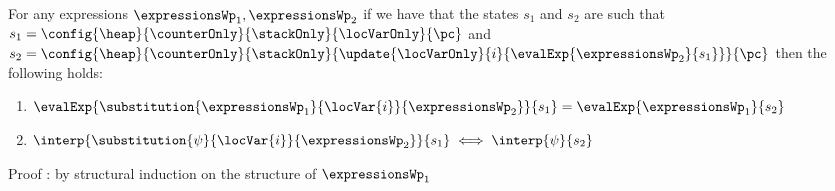\begin{substLv}\label{substLv}
For any expressions $ \expressionsWp_1, \expressionsWp_2 $ 
if we have that the states $s_1$ and $s_2$ are such that
$ s_1 =   \config{\heap}{\counterOnly}{ \stackOnly }{\locVarOnly}{\pc }$ and 
$ s_2 =   \config{\heap}{\counterOnly }{ \stackOnly }{\update{\locVarOnly}{i}{ \evalExp{ \expressionsWp_2}{ s_1 } }}{\pc }  $ then 
the following holds:
\begin{enumerate}
      \item $\evalExp{\substitution{\expressionsWp_1}{ \locVar{i} }{ \expressionsWp_2 }}{ s_1 } = \evalExp{\expressionsWp_1}{s_2} $
      \item $\interp{\substitution{\psi}{ \locVar{i} }{ \expressionsWp_2 }}{ s_1 } \iff \interp{\psi}{s_2} $
\end{enumerate}
\end{substLv}
Proof : by structural induction on the structure of $\expressionsWp_1$ 
